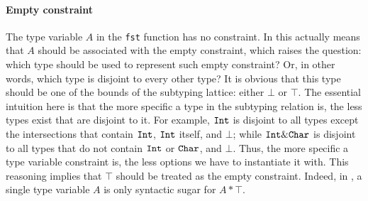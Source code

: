 \paragraph{Empty constraint}
The type variable $A$ in the \lstinline$fst$ function has no constraint.
In \name this actually means that $A$ should be associated with the empty constraint,
which raises the question: which type should be used to represent such empty constraint?
Or, in other words, which type is disjoint to every other type? 
It is obvious that this type should be one of the bounds of the subtyping lattice: either $\bot$ or
$\top$.
The essential intuition here is that the more specific a type in the subtyping relation is, the less types
exist that are disjoint to it.
For example, $\texttt{Int}$ is disjoint to all types except the intersections that contain $\texttt{Int}$, $\texttt{Int}$
itself, and $\bot$; while $\texttt{Int} \& \texttt{Char}$ is disjoint to all types that do not contain $\texttt{Int}$ or
$\texttt{Char}$, and $\bot$.
Thus, the more specific a type variable constraint is, the less options we have to instantiate it with.
This reasoning implies that $\top$ should be treated as the empty constraint.
Indeed, in \name, a single type variable $A$ is only syntactic sugar
for $A * \top$.
\begin{comment}
\joao{should we say anything here about this going against our
  previous top-disjointness formulation?}
\bruno{yes, but not here. We can discuss this in later sections when
  discussing the technical details.}
For instance, the type of the identity function in System $F$ that reads $\forall A. A \to A$ is 
equivalent to the \name's type $\forall (A * \top). A \to A$.
\end{comment}


